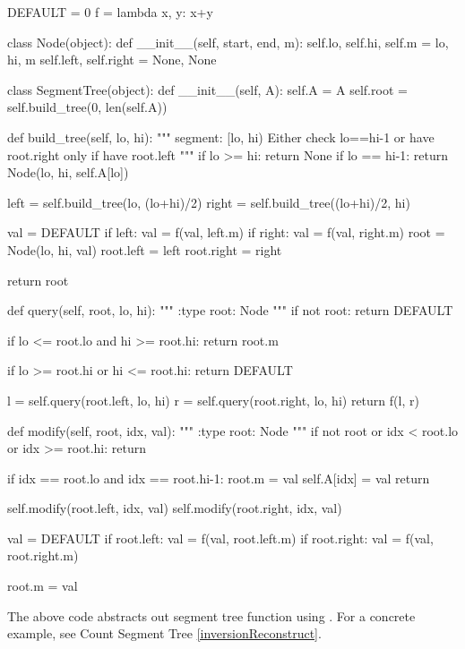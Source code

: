 \begin{python}
DEFAULT = 0
f = lambda x, y: x+y


class Node(object):
    def __init__(self, start, end, m):
        self.lo, self.hi, self.m = lo, hi, m
        self.left, self.right = None, None


class SegmentTree(object):
    def __init__(self, A):
        self.A = A
        self.root = self.build_tree(0, len(self.A))

    def build_tree(self, lo, hi):
        """
        segment: [lo, hi)
        Either check lo==hi-1 or have root.right 
        only if have root.left
        """
        if lo >= hi:   return None
        if lo == hi-1: return Node(lo, hi, self.A[lo])

        left  = self.build_tree(lo, (lo+hi)/2)
        right = self.build_tree((lo+hi)/2, hi)

        val = DEFAULT
        if left:  val = f(val, left.m)
        if right: val = f(val, right.m)
        root = Node(lo, hi, val)
        root.left  = left
        root.right = right

        return root

    def query(self, root, lo, hi):
        """
        :type root: Node
        """
        if not root:
            return DEFAULT

        if lo <= root.lo and hi >= root.hi:
            return root.m

        if lo >= root.hi or  hi <= root.hi:
            return DEFAULT

        l = self.query(root.left,  lo, hi)
        r = self.query(root.right, lo, hi)
        return f(l, r)

    def modify(self, root, idx, val):
        """
        :type root: Node
        """
        if not root or idx < root.lo or idx >= root.hi:
            return

        if idx == root.lo and idx == root.hi-1:
            root.m = val
            self.A[idx] = val
            return

        self.modify(root.left,  idx, val)
        self.modify(root.right, idx, val)

        val = DEFAULT
        if root.left:  val = f(val, root.left.m)
        if root.right: val = f(val, root.right.m)
        
        root.m = val
\end{python}
The above code abstracts out segment tree function using . For a concrete example, see Count Segment Tree \ref{inversionReconstruct}. 

